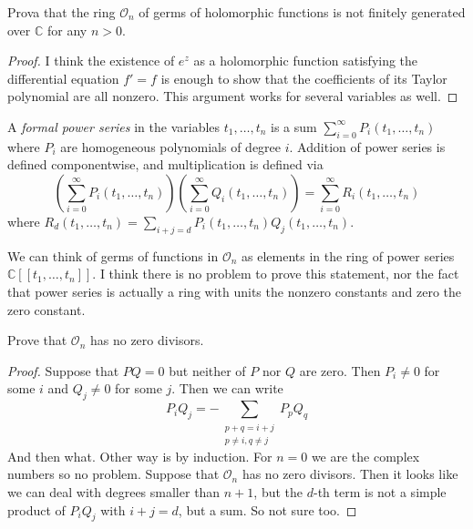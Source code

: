 \begin{exercise}
\label{exercise-stalk-is-not-finitely-generated-over-C}
Prova that the ring $\mathcal{O}_n$ of germs of holomorphic functions is not
finitely generated over $\mathbb{C}$ for any $n>0$.
\end{exercise}

\begin{proof}
I think the existence of $e^z$ as a holomorphic function satisfying the
differential equation $f'=f$ is enough to show that the coefficients of its
Taylor polynomial are all nonzero. This argument works for several variables as
well.
\end{proof}

\begin{definition}
\label{definition-formal-power-series}
A {\it formal power series} in the variables $t_1,\ldots,t_n$ is a sum
$\sum_{i=0}^{\infty}P_i(t_1,\ldots,t_n)$ where $P_i$ are homogeneous polynomials
of degree $i$. Addition of power series is defined componentwise, and
multiplication is defined via
$$
\left(\sum_{i=0}^\infty P_i(t_1,\ldots,t_n)\right)
\left(\sum_{i=0}^\infty Q_i(t_1,\ldots,t_n)\right)
=\sum_{i=0}^\infty R_i(t_1,\ldots,t_n)
$$
where $R_d(t_1,\ldots,t_n)=\sum_{i+j=d}P_i(t_1,\ldots,t_n)Q_j(t_1,\ldots,t_n)$.
\end{definition}

We can think of germs of functions in $\mathcal{O}_n$ as elements in the ring of
power series $\mathbb{C}[\![t_1,\ldots,t_n]\!]$. I think there is no problem to
prove this statement, nor the fact that power series is actually a ring with
units the nonzero constants and zero the zero constant.

\begin{exercise}
\label{exercise-stalk-has-no-zero-divisors}
Prove that $\mathcal{O}_n$ has no zero divisors.
\end{exercise}

\begin{proof}
Suppose that $PQ=0$ but neither of $P$ nor $Q$ are zero. Then $P_i \neq 0$ for
some $i$ and $Q_j \neq 0$ for some $j$. Then we can write
$$
P_iQ_j=-\sum_{\substack{p+q=i+j \\ p\neq i,q\neq j}}P_pQ_q
$$
And then what. Other way is by induction. For $n=0$ we are the complex numbers
so no problem. Suppose that $\mathcal{O}_n$ has no zero divisors. Then it looks
like we can deal with degrees smaller than $n+1$, but the $d$-th term is not a
simple product of $P_iQ_j$ with $i+j=d$, but a sum. So not sure too.
\end{proof}

